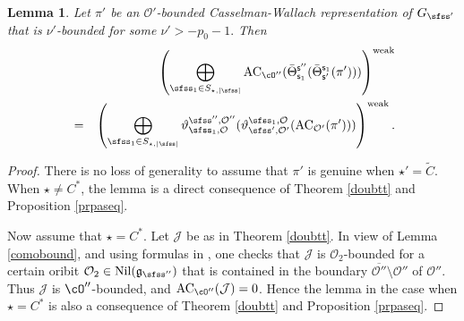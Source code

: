 \documentclass[12pt,a4paper]{amsart}
\def\abs#1{\left|{#1}\right|}
\newcommand{\CJ}{{\mathcal {J}}}
\newcommand{\CO}{{\mathcal {O}}}
\newcommand{\g}{\mathfrak g}
\numberwithin{equation}{section}
\newtheorem{lem}[thm]{Lemma}
\theoremstyle{remark}
\def\Thetab{\bar{\Theta}}
\begin{document}
\begin{lem}\label{lem:GDS.AC2}
  Let $\pi'$ be an $\CO'$-bounded Casselman-Wallach representation of $G_{\sfss'}$  that is  $\nu'$-bounded for some
$
  \nu'>
 -p_0-1.
$
Then 
 \begin{eqnarray*}
  && \left( \bigoplus_{\sfss_1\in S_{\star, \abs{\sfss}} } \mathrm{AC}_{\cO''}( \Thetab^{\mathsf s''}_{\mathsf s_1}(\Thetab_{\mathsf s'}^{\mathsf s_1}(\pi')))\right)^{\mathrm{weak}} 
\\
&=& \left( \bigoplus_{\sfss_1\in S_{\star, \abs{\sfss}}}   \vartheta^{\sfss'', \CO''}_{\sfss_1, \CO}(\vartheta^{\sfss_1, \CO}_{\sfss',\CO'}(\mathrm{AC}_{\CO'}(\pi')))\right)^{\mathrm{weak}}.        
\end{eqnarray*}

\end{lem}
\begin{proof}
There is no loss of generality to assume that $\pi'$ is genuine when $\star'=\widetilde C$. When $\star\neq C^*$, the lemma is a direct consequence of Theorem \ref{doubtt} and Proposition \ref{prpaseq}. 

Now assume that $\star=C^*$.  Let $\CJ$ be as in Theorem \ref{doubtt}. In view of Lemma \ref{comobound}, and using formulas in  \cite[Theorems 5.2 and 5.6]{DKPC}, one checks that $\CJ$ is $\CO_2$-bounded for a certain oribit $\CO_2\in \mathrm{Nil}(\g_{\sfss''})$ that is contained in the boundary $\overline{\CO''}\setminus \CO''$ of  $\CO''$. Thus 
$\CJ$ is $\cO''$-bounded, and $ \mathrm{AC}_{\cO''}(\CJ)=0$. Hence  the  lemma in the case when $\star=C^*$  is also a consequence of Theorem \ref{doubtt} and Proposition \ref{prpaseq}. 

\end{proof}
\end{document}
